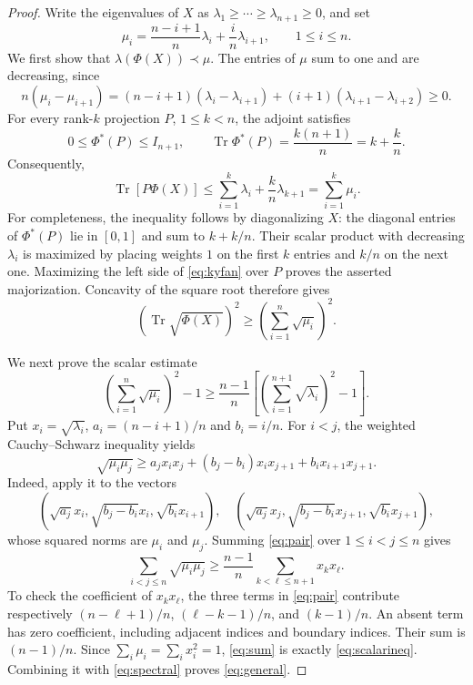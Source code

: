 \documentclass[11pt]{article}
\newcommand{\Tr}{\operatorname{Tr}}
\begin{document}
\begin{proof}
Write the eigenvalues of $X$ as
$\lambda_1\ge\cdots\ge\lambda_{n+1}\ge0$, and set
\begin{equation}\label{eq:mu}
 \mu_i=\frac{n-i+1}{n}\lambda_i+\frac{i}{n}\lambda_{i+1},\qquad 1\le i\le n.
\end{equation}
We first show that $\lambda(\Phi(X))\prec\mu$. The entries of $\mu$ sum to one and are decreasing, since
\[
 n(\mu_i-\mu_{i+1})=(n-i+1)(\lambda_i-\lambda_{i+1})
 +(i+1)(\lambda_{i+1}-\lambda_{i+2})\ge0.
\]
For every rank-$k$ projection $P$, $1\le k<n$, the adjoint satisfies
\[
 0\le\Phi^*(P)\le I_{n+1},\qquad
 \Tr\Phi^*(P)=\frac{k(n+1)}n=k+\frac kn.
\]
Consequently,
\begin{equation}\label{eq:kyfan}
 \Tr[P\Phi(X)]\le\sum_{i=1}^k\lambda_i+\frac kn\lambda_{k+1}
 =\sum_{i=1}^k\mu_i.
\end{equation}
For completeness, the inequality follows by diagonalizing $X$: the diagonal entries of $\Phi^*(P)$ lie in $[0,1]$ and sum to $k+k/n$. Their scalar product with decreasing $\lambda_i$ is maximized by placing weights $1$ on the first $k$ entries and $k/n$ on the next one. Maximizing the left side of \eqref{eq:kyfan} over $P$ proves the asserted majorization. Concavity of the square root therefore gives
\begin{equation}\label{eq:spectral}
 (\Tr\sqrt{\Phi(X)})^2\ge\left(\sum_{i=1}^n\sqrt{\mu_i}\right)^2.
\end{equation}

We next prove the scalar estimate
\begin{equation}\label{eq:scalarineq}
 \left(\sum_{i=1}^n\sqrt{\mu_i}\right)^2-1
 \ge\frac{n-1}{n}
 \left[\left(\sum_{i=1}^{n+1}\sqrt{\lambda_i}\right)^2-1\right].
\end{equation}
Put $x_i=\sqrt{\lambda_i}$, $a_i=(n-i+1)/n$ and $b_i=i/n$. For $i<j$, the weighted Cauchy--Schwarz inequality yields
\begin{equation}\label{eq:pair}
 \sqrt{\mu_i\mu_j}\ge
 a_jx_ix_j+(b_j-b_i)x_ix_{j+1}+b_ix_{i+1}x_{j+1}.
\end{equation}
Indeed, apply it to the vectors
\[
 (\sqrt{a_j}x_i,\sqrt{b_j-b_i}x_i,\sqrt{b_i}x_{i+1}),\quad
 (\sqrt{a_j}x_j,\sqrt{b_j-b_i}x_{j+1},\sqrt{b_i}x_{j+1}),
\]
whose squared norms are $\mu_i$ and $\mu_j$.
Summing \eqref{eq:pair} over $1\le i<j\le n$ gives
\begin{equation}\label{eq:sum}
 \sum_{i<j\le n}\sqrt{\mu_i\mu_j}
 \ge\frac{n-1}{n}\sum_{k<\ell\le n+1}x_kx_\ell.
\end{equation}
To check the coefficient of $x_kx_\ell$, the three terms in \eqref{eq:pair} contribute respectively
$(n-\ell+1)/n$, $(\ell-k-1)/n$, and $(k-1)/n$.
An absent term has zero coefficient, including adjacent indices and boundary indices. Their sum is $(n-1)/n$.
Since $\sum_i\mu_i=\sum_i x_i^2=1$, \eqref{eq:sum} is exactly \eqref{eq:scalarineq}. Combining it with \eqref{eq:spectral} proves \eqref{eq:general}.
\end{proof}
\end{document}
